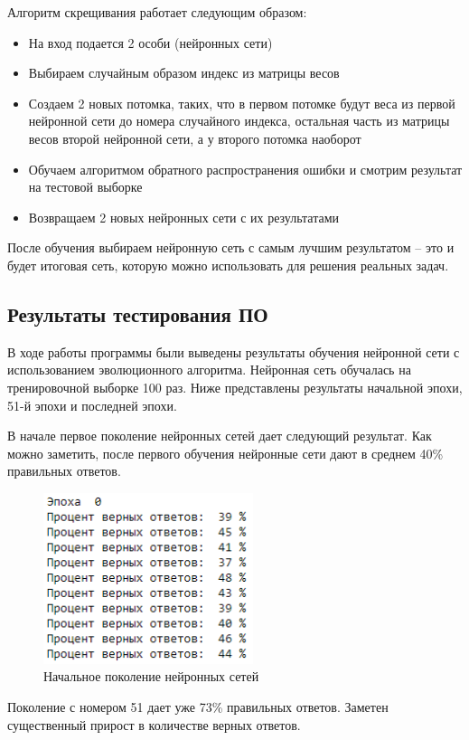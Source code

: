 Алгоритм скрещивания работает следующим образом:

\begin{itemize}
  \item На вход подается 2 особи (нейронных сети)
  \item Выбираем случайным образом индекс из матрицы весов
  \item Создаем 2 новых потомка, таких, что в первом потомке будут веса из первой нейронной сети до номера случайного индекса, остальная часть из матрицы весов второй нейронной сети, а у второго потомка наоборот
  \item Обучаем алгоритмом обратного распространения ошибки и смотрим результат на тестовой выборке
  \item Возвращаем 2 новых нейронных сети с их результатами
\end{itemize}

После обучения выбираем нейронную сеть с самым лучшим результатом – это и будет итоговая сеть, которую можно использовать для решения реальных задач.

\subsection{Результаты тестирования ПО}

В ходе работы программы были выведены результаты обучения нейронной сети с использованием эволюционного алгоритма. Нейронная сеть обучалась на тренировочной выборке 100 раз. Ниже представлены результаты начальной эпохи, 51-й эпохи и последней эпохи.

В начале первое поколение нейронных сетей дает следующий результат. Как можно заметить, после первого обучения нейронные сети дают в среднем 40\% правильных ответов.

\begin{figure}[H]
  \centering
  \includegraphics[width=0.4\linewidth]{./img/first-epoch}
  \caption{Начальное поколение нейронных сетей}
  \label{fig:mpr} 
\end{figure}

Поколение с номером 51 дает уже 73\% правильных ответов. Заметен существенный прирост в количестве верных ответов.

